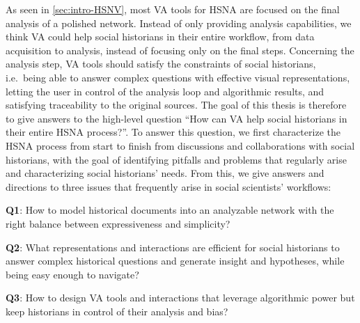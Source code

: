 As seen in \autoref{sec:intro-HSNV}, most VA tools for HSNA are focused on the final analysis of a polished network.
Instead of only providing analysis capabilities, we think VA could help social historians in their entire workflow, from data acquisition to analysis, instead of focusing only on the final steps.
Concerning the analysis step, VA tools should satisfy the constraints of social historians, i.e.\ being able to answer complex questions with effective visual representations, letting the user in control of the analysis loop and algorithmic results, and satisfying traceability to the original sources.
The goal of this thesis is therefore to give answers to the high-level question ``How can VA help social historians in their entire HSNA process?''.
To answer this question, we first characterize the HSNA process from start to finish from discussions and collaborations with social historians, with the goal of identifying pitfalls and problems that regularly arise and characterizing social historians' needs.
From this, we give answers and directions to three issues that frequently arise in social scientists' workflows:

\newcommand{\qone}{\textbf{Q1}\xspace}
\newcommand{\qtwo}{\textbf{Q2}\xspace}
\newcommand{\qthree}{\textbf{Q3}\xspace}
\begin{description}
    \item \qone:  How to model historical documents into an analyzable network with the right balance between expressiveness and simplicity?
    \item \qtwo:  What representations and interactions are efficient for social historians to answer complex historical questions and generate insight and hypotheses, while being easy enough to navigate?
    \item \qthree: How to design VA tools and interactions that leverage algorithmic power but keep historians in control of their analysis and bias?
\end{description}


